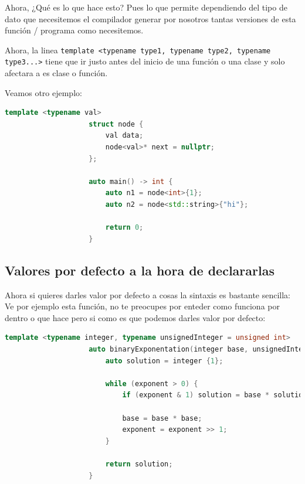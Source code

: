 \documentclass[12pt, fleqn]{report}                             %
\theoremstyle{break}                                            %
\newcommand{\textCode}[1]  { \texttt{#1} }                      %
\begin{document}
                Ahora, ¿Qué es lo que hace esto? Pues lo que permite dependiendo del tipo 
                de dato que necesitemos el compilador generar por nosotros tantas versiones de esta función / programa
                como necesitemos.

                Ahora, la linea \textCode{template <typename type1, typename type2, typename type3...>} 
                tiene que ir justo antes del inicio de una función o una clase y solo afectara a es clase o función. 

                Veamos otro ejemplo:
                \begin{lstlisting}[language=C++, gobble=20]
                    template <typename val>
                    struct node {
                        val data;
                        node<val>* next = nullptr;
                    };
                                        
                    auto main() -> int {
                        auto n1 = node<int>{1};
                        auto n2 = node<std::string>{"hi"};

                        return 0;
                    }

                \end{lstlisting}
                

            \subsection{Valores por defecto a la hora de declararlas}

                Ahora si quieres darles valor por defecto a cosas la sintaxis es bastante sencilla:
                Ve por ejemplo esta función, no te preocupes por enteder como funciona por dentro o que hace
                pero si como es que podemos darles valor por defecto:
                \begin{lstlisting}[language=C++, gobble=20]
                    template <typename integer, typename unsignedInteger = unsigned int>
                    auto binaryExponentation(integer base, unsignedInteger exponent) -> integer {
                        auto solution = integer {1};

                        while (exponent > 0) {
                            if (exponent & 1) solution = base * solution;

                            base = base * base;
                            exponent = exponent >> 1;
                        }

                        return solution;
                    }
                \end{lstlisting}
\end{document}
